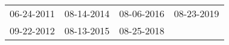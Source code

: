 \begin{supertabular}{llll}
 06-24-2011 &  08-14-2014 &  08-06-2016 &  08-23-2019 \\
 09-22-2012 &  08-13-2015 &  08-25-2018 &             \\
\end{supertabular}
